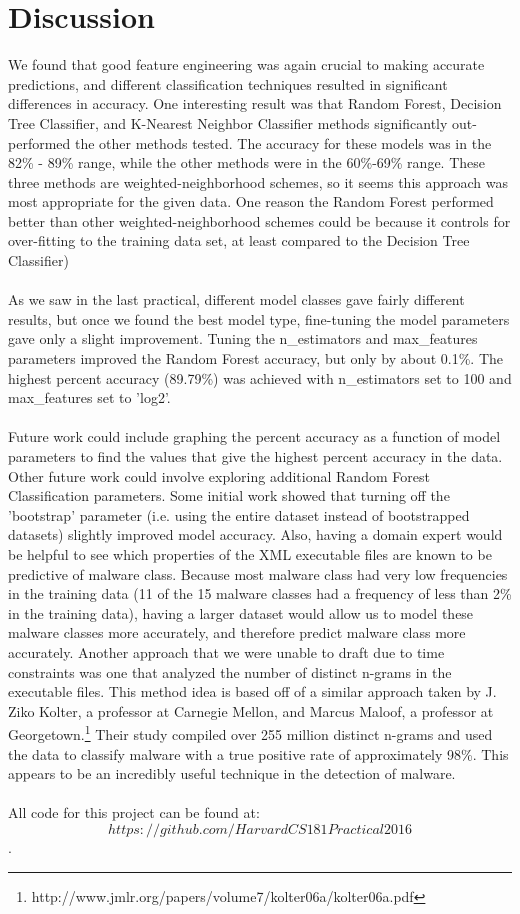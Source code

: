 \documentclass{article}
\begin{document}
\section{Discussion}
We found that good feature engineering was again crucial to making accurate predictions, and different classification techniques resulted in significant differences in accuracy. One interesting result was that Random Forest, Decision Tree Classifier, and K-Nearest Neighbor Classifier methods significantly out-performed the other methods tested. The accuracy for these models was in the 82\% - 89\% range, while the other methods were in the 60\%-69\% range.  These three methods are weighted-neighborhood schemes, so it seems this approach was most appropriate for the given data. One reason the Random Forest performed better than other weighted-neighborhood schemes could be because it controls for over-fitting to the training data set, at least compared to the Decision Tree Classifier)\\\\
As we saw in the last practical, different model classes gave fairly different results, but once we found the best model type, fine-tuning the model parameters gave only a slight improvement. Tuning the n\_estimators and max\_features parameters improved the Random Forest accuracy, but only by about 0.1\%. The highest percent accuracy (89.79\%) was achieved with n\_estimators set to 100 and max\_features set to 'log2'.\\\\
Future work could include graphing the percent accuracy as a function of model parameters to find the values that give the highest percent accuracy in the data. Other future work could involve exploring additional Random Forest Classification parameters. Some initial work showed that turning off the 'bootstrap' parameter (i.e. using the entire dataset instead of bootstrapped datasets) slightly improved model accuracy. Also, having a domain expert would be helpful to see which properties of the XML executable files are known to be predictive of malware class. Because most malware class had very low frequencies in the training data (11 of the 15 malware classes had a frequency of less than 2\% in the training data), having a larger dataset would allow us to model these malware classes more accurately, and therefore predict malware class more accurately. Another approach that we were unable to draft due to time constraints was one that analyzed the number of distinct n-grams in the executable files. This method idea is based off of a similar approach taken by J. Ziko Kolter, a professor at Carnegie Mellon, and Marcus Maloof, a professor at Georgetown.\footnote{http://www.jmlr.org/papers/volume7/kolter06a/kolter06a.pdf} Their study compiled over 255 million distinct n-grams and used the data to classify malware with a true positive rate of approximately 98\%. This appears to be an incredibly useful technique in the detection of malware. \\\\
All code for this project can be found at: $$https://github.com/HarvardCS181Practical2016$$.
\end{document}
